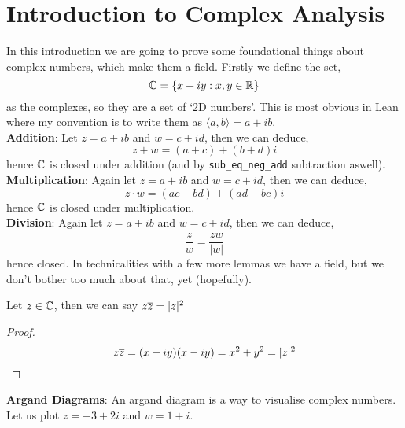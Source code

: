 \documentclass{article}
\begin{document}
  \maketitle

  \section{Introduction to Complex Analysis}
  In this introduction we are going to prove some foundational things about complex numbers, which make them a field. Firstly we define the set,
  $$ \mathbb{C} = \{ x + iy : x, y \in \mathbb{R} \} $$
  as the complexes, so they are a set of `2D numbers'. This is most obvious in Lean where my convention is to write them as $\langle a , b \rangle = a + ib$.\\
  \textbf{Addition}: Let $\displaystyle{z = a + ib}$ and $\displaystyle{w = c + id}$, then we can deduce,
  $$ z + w = (a + c) + (b + d)i $$
  hence $\mathbb{C}$ is closed under addition (and by \texttt{sub\_eq\_neg\_add} subtraction aswell).\\
  \textbf{Multiplication}: Again let $\displaystyle{z = a + ib}$ and $\displaystyle{w = c + id}$, then we can deduce,
  $$ z \cdot w = (ac - bd) + (ad - bc)i $$
  hence $\mathbb{C}$ is closed under multiplication.\\
  \textbf{Division}: Again let $\displaystyle{z = a + ib}$ and $\displaystyle{w = c + id}$, then we can deduce,
  $$ \frac{z}{w} = \frac{z\overline{w}}{|w|} $$
hence closed. In technicalities with a few more lemmas we have a field, but we don't bother too much about that, yet (hopefully).
\begin{nlemma}
  Let $z \in \mathbb{C}$, then we can say $z\overline{z} = |z|^2$
\end{nlemma}
\begin{proof}
  $$z\overline{z} = (x + iy)(x - iy) = x^2 + y^2 = |z|^2$$
\end{proof}
\textbf{Argand Diagrams}: An argand diagram is a way to visualise complex numbers. Let us plot $\displaystyle{z = -3 + 2i}$ and $\displaystyle{w = 1 + i}$.\\
\begin{figure}[!ht]
  \centering
\end{figure}
\end{document}
